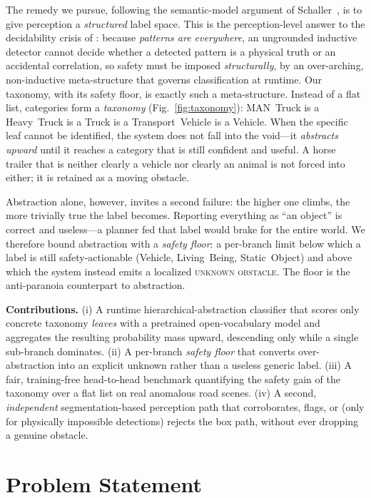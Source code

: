 \documentclass[conference]{IEEEtran}
\begin{document}
The remedy we pursue, following the semantic-model argument of
Schaller~\cite{schaller2025}, is to give perception a \emph{structured} label
space. This is the perception-level answer to the decidability crisis of
\cite{schaller_patterns}: because \emph{patterns are everywhere}, an ungrounded
inductive detector cannot decide whether a detected pattern is a physical truth
or an accidental correlation, so safety must be imposed \emph{structurally}, by
an over-arching, non-inductive meta-structure that governs classification at
runtime. Our taxonomy, with its safety floor, is exactly such a meta-structure.
Instead of a flat list, categories form a \emph{taxonomy}
(Fig.~\ref{fig:taxonomy}): \textsf{MAN~Truck} is a \textsf{Heavy~Truck} is a
\textsf{Truck} is a \textsf{Transport~Vehicle} is a \textsf{Vehicle}. When the
specific leaf cannot be identified, the system does not fall into the void---it
\emph{abstracts upward} until it reaches a category that is still confident and
useful. A horse trailer that is neither clearly a vehicle nor clearly an animal
is not forced into either; it is retained as a moving obstacle.

Abstraction alone, however, invites a second failure: the higher one climbs, the
more trivially true the label becomes. Reporting everything as ``an object'' is
correct and useless---a planner fed that label would brake for the entire world.
We therefore bound abstraction with a \emph{safety floor}: a per-branch limit
below which a label is still safety-actionable (\textsf{Vehicle},
\textsf{Living~Being}, \textsf{Static~Object}) and above which the system instead
emits a localized \textsc{unknown obstacle}. The floor is the anti-paranoia
counterpart to abstraction.

\textbf{Contributions.} (i) A runtime hierarchical-abstraction classifier that
scores only concrete taxonomy \emph{leaves} with a pretrained open-vocabulary
model and aggregates the resulting probability mass upward, descending only while
a single sub-branch dominates. (ii) A per-branch \emph{safety floor} that
converts over-abstraction into an explicit unknown rather than a useless generic
label. (iii) A fair, training-free head-to-head benchmark quantifying the safety
gain of the taxonomy over a flat list on real anomalous road scenes. (iv) A
second, \emph{independent} segmentation-based perception path that corroborates,
flags, or (only for physically impossible detections) rejects the box path,
without ever dropping a genuine obstacle.

\section{Problem Statement}
\label{sec:problem}
\end{document}

